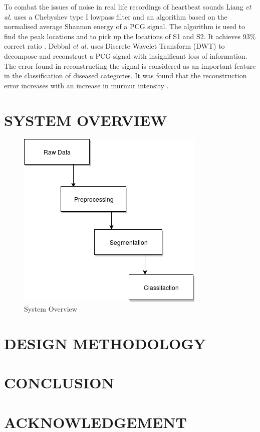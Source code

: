\documentclass[10pt,twocolumn]{witseiepaper}
\begin{document}
To combat the issues of noise in real life recordings of heartbeat sounds Liang \textit{et al.} uses a Chebyshev type I lowpass filter and an algorithm  based on the normalised average Shannon energy of a PCG signal. The algorithm is used to find the peak locations and to pick up the locations of S1 and S2. It achieves 93\% correct ratio \cite{liang1997heart}. Debbal \textit{et al.} uses Discrete Wavelet Transform (DWT) to decompose and reconstruct a PCG signal with insignificant loss of information. The error found in reconstructing the signal is considered as an important feature in the classification of diseased categories. It was found that the reconstruction error increases with an increase in murmur intensity \cite{debbal}.



\section{SYSTEM OVERVIEW}

\begin{figure}[h!]
    \centering
    \includegraphics[scale = 0.52]{systemOverviw.png}
    \caption{System Overview}
    \label{fig:sysov}
\end{figure}{}
\section{DESIGN METHODOLOGY}



\section{CONCLUSION}



%
\section*{ACKNOWLEDGEMENT}



%



\end{document}
